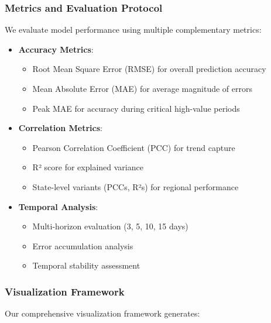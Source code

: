 \documentclass[lettersize, journal]{IEEEtran}
\begin{document}
\subsubsection{Metrics and Evaluation Protocol}
We evaluate model performance using multiple complementary metrics:

\begin{itemize}
    \item \textbf{Accuracy Metrics}:
    \begin{itemize}
        \item Root Mean Square Error (RMSE) for overall prediction accuracy
        \item Mean Absolute Error (MAE) for average magnitude of errors
        \item Peak MAE for accuracy during critical high-value periods
    \end{itemize}
    
    \item \textbf{Correlation Metrics}:
    \begin{itemize}
        \item Pearson Correlation Coefficient (PCC) for trend capture
        \item R² score for explained variance
        \item State-level variants (PCCs, R²s) for regional performance
    \end{itemize}
    
    \item \textbf{Temporal Analysis}:
    \begin{itemize}
        \item Multi-horizon evaluation (3, 5, 10, 15 days)
        \item Error accumulation analysis
        \item Temporal stability assessment
    \end{itemize}
\end{itemize}

\subsubsection{Visualization Framework}
Our comprehensive visualization framework generates:
\end{document}
